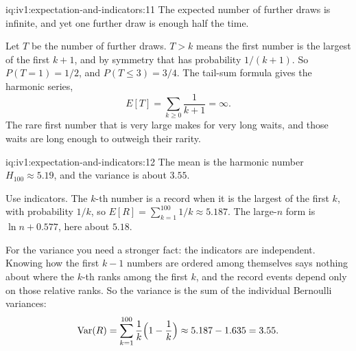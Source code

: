 \begin{solution}{iq:iv1:expectation-and-indicators:11}
The expected number of further draws is infinite, and yet one further draw is enough half the time.

Let $T$ be the number of further draws. $T > k$ means the first number is the largest of the first $k+1$, and by symmetry
that has probability $1/(k+1)$. So $P(T = 1) = 1/2$, and $P(T \le 3) = 3/4$. The tail-sum formula
gives the harmonic series,
\[
E[T] = \sum_{k \ge 0} \frac{1}{k+1} = \infty.
\]
The rare first number that is very large makes for very long waits, and those waits are long enough to outweigh their rarity.

\end{solution}

\begin{solution}{iq:iv1:expectation-and-indicators:12}
The mean is the harmonic number $H_{100} \approx 5.19$, and the variance is about $3.55$.

Use indicators. The $k$-th number is a record when it is the largest of the first $k$, with probability $1/k$, so
$E[R] = \sum_{k=1}^{100} 1/k \approx 5.187$. The large-$n$ form is $\ln n + 0.577$, here about $5.18$.

For the variance you need a stronger fact: the indicators are independent. Knowing how the first $k-1$ numbers are ordered among
themselves says nothing about where the $k$-th ranks among the first $k$, and the record events depend only on those relative ranks. So the
variance is the sum of the individual Bernoulli variances:
\[
\mathrm{Var}(R) = \sum_{k=1}^{100} \frac1k\Bigl(1 - \frac1k\Bigr) \approx 5.187 - 1.635 = 3.55.
\]
\end{solution}

